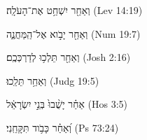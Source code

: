 
\begin{exe}

\ex\label{post_single_exs1}
\texthebrew{
וְאַחַ֖ר יִשְׁחַ֥ט אֶת־הָעֹלָֽה׃ 
} (Lev 14:19)

\ex\label{post_single_exs2}
\texthebrew{
וְאַחַ֖ר יָבֹ֣וא אֶל־הַֽמַּחֲנֶ֑ה 
} (Num 19:7)

\ex\label{post_single_exs3}
\texthebrew{
וְאַחַ֖ר תֵּלְכ֥וּ לְדַרְכְּכֶֽם׃ 
} (Josh 2:16)

\ex\label{post_single_exs4}
\texthebrew{
וְאַחַ֥ר תֵּלֵֽכוּ׃ 
} (Judg 19:5)

\ex\label{post_single_exs5}
\texthebrew{
אַחַ֗ר יָשֻׁ֨בוּ֙ בְּנֵ֣י יִשְׂרָאֵ֔ל 
} (Hos 3:5)

\ex\label{post_single_exs6}
\texthebrew{
וְ֝אַחַ֗ר כָּבֹ֥וד תִּקָּחֵֽנִי׃ 
} (Ps 73:24)

\end{exe}
